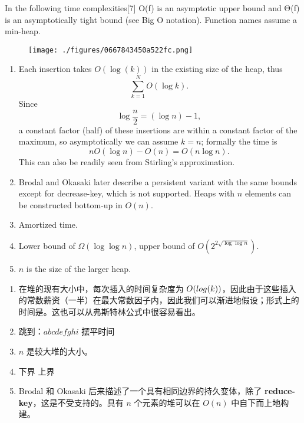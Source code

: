 In the following time complexities[7] O(f) is an asymptotic upper bound and Θ(f) is an asymptotically tight bound (see Big O notation). Function names assume a min-heap.
\begin{figure}[ht]
\centering
\texttt{[image: ./figures/0667843450a522fc.png]}
\caption\label{fig_DUI_2}
\end{figure}
\begin{enumerate}
    \item Each insertion takes $O(\log(k))$ in the existing size of the heap, thus $$\sum_{k=1}^N O(\log k).~$$ Since 
   $$\log \frac{n}{2} = (\log n) - 1,~$$
    a constant factor (half) of these insertions are within a constant factor of the maximum, so asymptotically we can assume $k = n$; formally the time is 
   $$ n O(\log n) - O(n) = O(n \log n).~$$
    This can also be readily seen from Stirling's approximation.
    
    \item Brodal and Okasaki later describe a persistent variant with the same bounds except for decrease-key, which is not supported. Heaps with $n$ elements can be constructed bottom-up in $O(n)$.
    
    \item Amortized time.
    
    \item Lower bound of $\Omega(\log \log n)$, upper bound of $O(2^{2\sqrt{\log \log n}})$.
    
    \item $n$ is the size of the larger heap.
\end{enumerate}
\begin{enumerate}
    \item 在堆的现有大小中，每次插入的时间复杂度为 $O(\\log(k))$，因此由于这些插入的常数薪资（一半）在最大常数因子内，因此我们可以渐进地假设；形式上的时间是。这也可以从弗斯特林公式中很容易看出。
    \item 跳到：$a b c d e f g h i$ 摆平时间
    \item $n$ 是较大堆的大小。
    \item 下界 上界
    \item Brodal 和 Okasaki 后来描述了一个具有相同边界的持久变体，除了 \textbf{reduce-key}，这是不受支持的。具有 $n$ 个元素的堆可以在 $O(n)$ 中自下而上地构建。
\end{enumerate}

